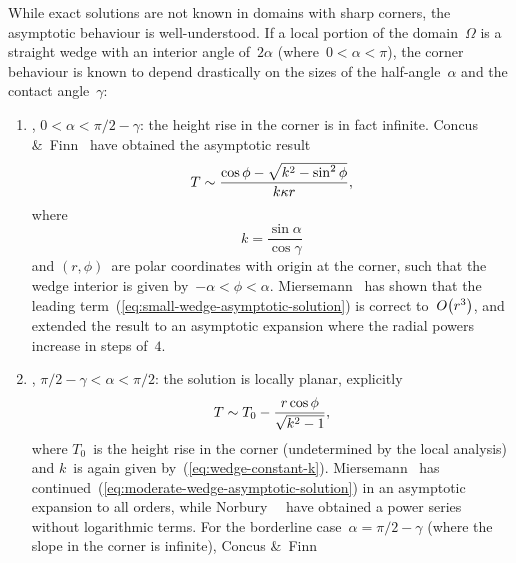 While exact solutions are not known in domains with sharp corners,
the asymptotic behaviour is well-understood.
If a local portion of the domain~$\Omega$
is a straight wedge with an interior angle of~$2 \alpha$
(where~$0 < \alpha < \pi$),
the corner behaviour is known to depend drastically
on the sizes of the half-angle~$\alpha$ and the contact angle~$\gamma$:
\begin{enumerate}
  \item
    , $0 < \alpha < \pi/2 - \gamma$:
    the height rise in the corner is in fact infinite.
    Concus \&~Finn~\cite{concus-1970-class-capillary-surfaces}
    have obtained the asymptotic result
    \begin{equation}
      T \sim \frac{\cos\phi - \sqrt{k^2 - \sin^2 \phi}}{k \kappa r},
      \label{eq:small-wedge-asymptotic-solution}
    \end{equation}
    where
    \begin{equation}
      k = \frac{\sin\alpha}{\cos\gamma}
      \label{eq:wedge-constant-k}
    \end{equation}
    and $(r, \phi)$~are polar coordinates with origin at the corner,
    such that the wedge interior is given by~$-\alpha < \phi < \alpha$.
    Miersemann~\cite{miersemann-1993-asymptotic-corner-capillary-singular}
    has shown that the leading term~(\ref{eq:small-wedge-asymptotic-solution})
    is correct to~$\order \roundbr*{r^3}$,
    and extended the result to an asymptotic expansion
    where the radial powers increase in steps of~$4$.
  \item
    , $\pi/2 - \gamma < \alpha < \pi/2$:
    the solution is locally planar,
    explicitly
    \begin{equation}
      T \sim T_0 - \frac{r \cos\phi}{\sqrt{k^2 - 1}},
      \label{eq:moderate-wedge-asymptotic-solution}
    \end{equation}
    where $T_0$~is the height rise in the corner
    (undetermined by the local analysis)
    and $k$~is again given by~(\ref{eq:wedge-constant-k}).
    Miersemann~\cite{miersemann-1988-asymptotic-expansion-corner-capillary}
    has continued~(\ref{eq:moderate-wedge-asymptotic-solution})
    in an asymptotic expansion to all orders,
    while Norbury~\etal~\cite{norbury-2005-corner-solutions-laplace-young}
    have obtained a power series without logarithmic terms.
    For the borderline case~$\alpha = \pi/2 - \gamma$
    (where the slope in the corner is infinite),
    Concus \&~Finn~\cite{concus-1969-behavior-capillary-surface-wedge}

\end{enumerate}
